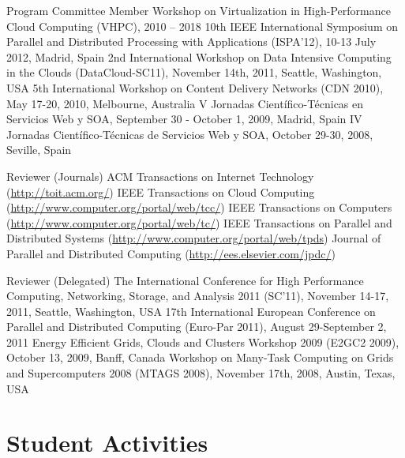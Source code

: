 \documentclass{resume}
\begin{document}
\begin{category}{Program Committee Member}
\citembullet Workshop on Virtualization in High-Performance Cloud Computing (VHPC), 2010 -- 2018
\citembullet 10th IEEE International Symposium on Parallel and Distributed Processing with Applications (ISPA'12), 10-13 July 2012, Madrid, Spain 
\citembullet 2nd International Workshop on Data Intensive Computing in the Clouds (DataCloud-SC11), November 14th, 2011, Seattle, Washington, USA
\citembullet 5th International Workshop on Content Delivery Networks (CDN 2010), May 17-20, 2010, Melbourne, Australia
\citembullet V Jornadas Científico-Técnicas en Servicios Web y SOA, September 30 - October 1, 2009, Madrid, Spain
\citembullet IV Jornadas Científico-Técnicas de Servicios Web y SOA, October 29-30, 2008, Seville, Spain
\end{category}

\begin{category}{Reviewer (Journals)}
\citembullet ACM Transactions on Internet Technology (\url{http://toit.acm.org/})
\citembullet IEEE Transactions on Cloud Computing (\url{http://www.computer.org/portal/web/tcc/})
\citembullet IEEE Transactions on Computers (\url{http://www.computer.org/portal/web/tc/})
\citembullet IEEE Transactions on Parallel and Distributed Systems (\url{http://www.computer.org/portal/web/tpds})
\citembullet Journal of Parallel and Distributed Computing (\url{http://ees.elsevier.com/jpdc/})
\end{category}

\begin{category}{Reviewer (Delegated)}
\citembullet The International Conference for High Performance Computing, Networking, Storage, and Analysis 2011 (SC'11), November 14-17, 2011, Seattle, Washington, USA
\citembullet 17th International European Conference on Parallel and Distributed Computing (Euro-Par 2011), August 29-September 2, 2011 
\citembullet Energy Efficient Grids, Clouds and Clusters Workshop 2009 (E2GC2 2009), October 13, 2009, Banff, Canada 
\citembullet Workshop on Many-Task Computing on Grids and Supercomputers 2008 (MTAGS 2008), November 17th, 2008, Austin, Texas, USA
\end{category}

\section*{\hspace{-1cm}Student Activities}
\end{document}
